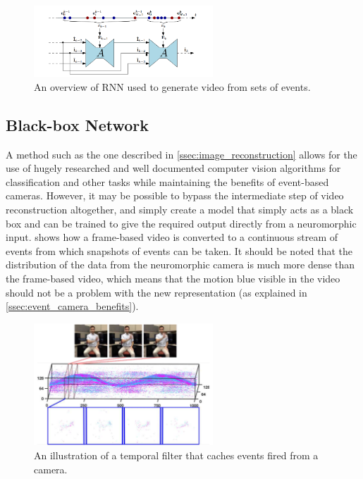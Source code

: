 \begin{figure}[htb]
      \centering
      \includegraphics[width=0.6\textwidth]{background/images/spikes_to_video_rnn.png}
      \caption{An overview of RNN used to generate video from sets of events\cite{spikingToVideo}.}
      \label{fig:spikes_to_video_rnn}
\end{figure}

\subsection{Black-box Network}

A method such as the one described in \cref{ssec:image_reconstruction} allows for the use of hugely researched and well documented computer vision algorithms for classification and other tasks while maintaining the benefits of event-based cameras. However, it may be possible to bypass the intermediate step of video reconstruction altogether, and simply create a model that simply acts as a black box and can be trained to give the required output directly from a neuromorphic input.  shows how a frame-based video is converted to a continuous stream of events from which snapshots of events can be taken. It should be noted that the distribution of the data from the neuromorphic camera is much more dense than the frame-based video, which means that the motion blue visible in the video should not be a problem with the new representation (as explained in \cref{ssec:event_camera_benefits}).

\begin{figure}[htb]
      \centering
      \includegraphics[width=0.6\textwidth]{background/images/temporal_filter.png}
      \caption{An illustration of a temporal filter that caches events fired from a camera\cite{eventBasedGestureRec}.}
      \label{fig:temporal_filter}
\end{figure}

